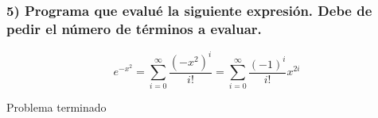 \subsubsection*{5) Programa que evalué la siguiente expresión. Debe de pedir el número de términos a evaluar.}
\begin{equation*}
    e^{-x^2} = \sum_{i=0}^\infty \frac{(-x^2)^i}{i!} = \sum_{i=0}^\infty \frac{(-1)^i}{i!} x^{2i}
\end{equation*}

Problema terminado